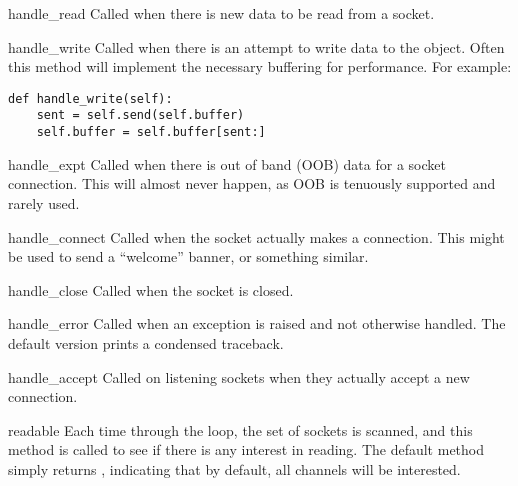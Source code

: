 \begin{methoddesc}{handle_read}{}
  Called when there is new data to be read from a socket.
\end{methoddesc}

\begin{methoddesc}{handle_write}{}
  Called when there is an attempt to write data to the object.  
  Often this method will implement the necessary buffering for 
  performance.  For example:

\begin{verbatim}
def handle_write(self):
    sent = self.send(self.buffer)
    self.buffer = self.buffer[sent:]
\end{verbatim}
\end{methoddesc}

\begin{methoddesc}{handle_expt}{}
  Called when there is out of band (OOB) data for a socket 
  connection.  This will almost never happen, as OOB is 
  tenuously supported and rarely used.
\end{methoddesc}

\begin{methoddesc}{handle_connect}{}
  Called when the socket actually makes a connection.  This 
  might be used to send a ``welcome'' banner, or something 
  similar.
\end{methoddesc}

\begin{methoddesc}{handle_close}{}
  Called when the socket is closed.
\end{methoddesc}

\begin{methoddesc}{handle_error}{}
  Called when an exception is raised and not otherwise handled.  The default
  version prints a condensed traceback.
\end{methoddesc}

\begin{methoddesc}{handle_accept}{}
  Called on listening sockets when they actually accept a new 
  connection.
\end{methoddesc}

\begin{methoddesc}{readable}{}
  Each time through the  loop, the set of sockets 
  is scanned, and this method is called to see if there is any 
  interest in reading.  The default method simply returns , 
  indicating that by default, all channels will be interested.
\end{methoddesc}

